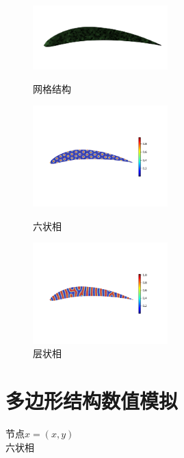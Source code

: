 \documentclass[12pt]{article}
\begin{document}
\begin{CJK}{UTF8}{gkai}
    \begin{figure}[H]
    	\setlength{\abovecaptionskip}{0.cm}
    	\setlength{\belowcaptionskip}{-0.cm}
    	\begin{minipage}[!htbp]{0.3\linewidth}
    		\includegraphics[width=5.2cm]{air_c.png}
    		\caption*{网格结构}
    	\end{minipage}
    	\hspace{0.23in}
    	\begin{minipage}[!htbp]{0.3\linewidth}
    		\includegraphics[width=5.2cm]{scftfigure6720.png}
    		\caption*{六状相}
    	\end{minipage}
    	\hspace{0.23in}
    	\begin{minipage}[!htbp]{0.3\linewidth}
    		\includegraphics[width=5.2cm]{scftfigure260.png}
    		\caption*{层状相}
    	\end{minipage}
    \end{figure} 


   \section{多边形结构数值模拟}


节点$x=(x,y)$\\

六状相\\


\end{CJK}
\end{document}
